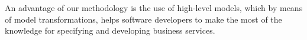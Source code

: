 An advantage of our methodology is the use of high-level models,
which by means of model transformations, helps software developers to make the
most of the knowledge for specifying and developing business services. 




